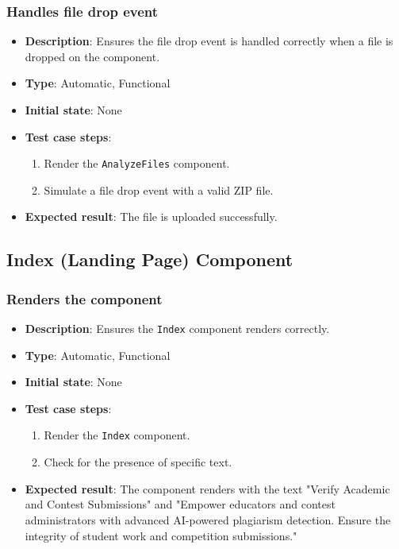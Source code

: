 \documentclass[12pt, titlepage]{article}
\begin{document}
\subsubsection{Handles file drop event}
\begin{itemize}
    \item \textbf{Description}: Ensures the file drop event is handled correctly when a file is dropped on the component.
    \item \textbf{Type}: Automatic, Functional
    \item \textbf{Initial state}: None
    \item \textbf{Test case steps}:
    \begin{enumerate}
        \item Render the \texttt{AnalyzeFiles} component.
        \item Simulate a file drop event with a valid ZIP file.
    \end{enumerate}
    \item \textbf{Expected result}: The file is uploaded successfully.
\end{itemize}

\subsection{Index (Landing Page) Component}

\subsubsection{Renders the component}
\begin{itemize}
    \item \textbf{Description}: Ensures the \texttt{Index} component renders correctly.
    \item \textbf{Type}: Automatic, Functional
    \item \textbf{Initial state}: None
    \item \textbf{Test case steps}:
    \begin{enumerate}
        \item Render the \texttt{Index} component.
        \item Check for the presence of specific text.
    \end{enumerate}
    \item \textbf{Expected result}: The component renders with the text "Verify Academic and Contest Submissions" and "Empower educators and contest administrators with advanced AI-powered plagiarism detection. Ensure the integrity of student work and competition submissions."
\end{itemize}
\end{document}
